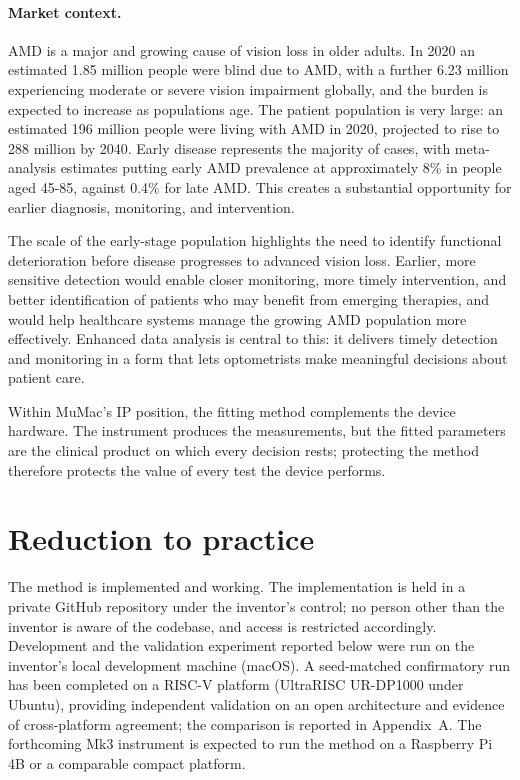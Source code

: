 \documentclass[11pt,a4paper]{article}
\begin{document}
\paragraph{Market context.}
AMD is a major and growing cause of vision loss in older adults. In 2020
an estimated 1.85 million people were blind due to AMD, with a further
6.23 million experiencing moderate or severe vision impairment globally,
and the burden is expected to increase as populations age. The patient
population is very large: an estimated 196 million people were living
with AMD in 2020, projected to rise to 288 million by 2040. Early disease
represents the majority of cases, with meta-analysis estimates putting
early AMD prevalence at approximately 8\% in people aged 45-85, against
0.4\% for late AMD. This creates a substantial opportunity for earlier
diagnosis, monitoring, and intervention.

The scale of the early-stage population highlights the need to identify
functional deterioration before disease progresses to advanced vision
loss. Earlier, more sensitive detection would enable closer monitoring,
more timely intervention, and better identification of patients who may
benefit from emerging therapies, and would help healthcare systems manage
the growing AMD population more effectively. Enhanced data analysis is
central to this: it delivers timely detection and monitoring in a form
that lets optometrists make meaningful decisions about patient care.

Within MuMac's IP position, the fitting method complements the device
hardware. The instrument produces the measurements, but the fitted
parameters are the clinical product on which every decision rests;
protecting the method therefore protects the value of every test the
device performs.

\section{Reduction to practice}
The method is implemented and working. The implementation is held in a
private GitHub repository under the inventor's control; no person other
than the inventor is aware of the codebase, and access is restricted
accordingly. Development and the validation experiment reported below
were run on the inventor's local development machine (macOS). A
seed-matched confirmatory run has been completed on a RISC-V platform
(UltraRISC UR-DP1000 under Ubuntu), providing independent validation on an
open architecture and evidence of cross-platform agreement; the
comparison is reported in Appendix~A. The forthcoming Mk3 instrument is
expected to run the method on a Raspberry Pi 4B or a comparable compact
platform.
\end{document}
